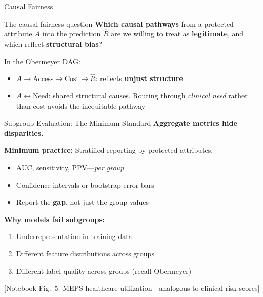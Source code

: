 \documentclass[aspectratio=169,10pt]{beamer}
\begin{document}
\begin{frame}{Causal Fairness}
\begin{block}{The causal fairness question}
\textbf{Which causal pathways} from a protected attribute $A$ into the prediction $\hat{R}$ are we willing to treat as \textbf{legitimate}, and which reflect \textbf{structural bias}?
\end{block}

\vspace{0.2em}
In the Obermeyer DAG:
\begin{itemize}[<+->]
    \item $A \to \text{Access} \to \text{Cost} \to \hat{R}$: reflects \textbf{unjust structure}
    \item $A \leftrightarrow \text{Need}$: shared structural causes. Routing through \emph{clinical need} rather than cost avoids the inequitable pathway
\end{itemize}

\vspace{0.2em}

\vspace{0.1em}
\end{frame}

\begin{frame}{Subgroup Evaluation: The Minimum Standard}
\textbf{Aggregate metrics hide disparities.}

\vspace{0.3em}
\textbf{Minimum practice:} Stratified reporting by protected attributes.
\begin{itemize}
    \item AUC, sensitivity, PPV---\emph{per group}
    \item Confidence intervals or bootstrap error bars
    \item Report the \textbf{gap}, not just the group values
\end{itemize}

\vspace{0.3em}
\textbf{Why models fail subgroups:}
\begin{enumerate}
    \item Underrepresentation in training data
    \item Different feature distributions across groups
    \item Different label quality across groups (recall Obermeyer)
\end{enumerate}

{\small [Notebook Fig.~5: MEPS healthcare utilization---analogous to clinical risk scores]}
\end{frame}
\end{document}
